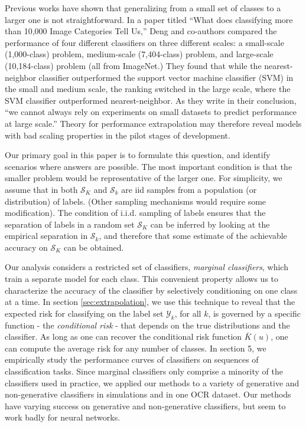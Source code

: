 \documentclass[12pt]{article}
\begin{document}
Previous works have shown that generalizing from a small set of classes 
to a larger one is not straightforward. In a paper titled ``What
does classifying more than 10,000 Image Categories Tell Us,'' Deng and
co-authors compared the performance of four different classifiers on
three different scales: a small-scale (1,000-class) problem,
medium-scale (7,404-class) problem, and large-scale (10,184-class)
problem (all from ImageNet.)  They found that while the
nearest-neighbor classifier outperformed the support vector machine
classifier (SVM) in the small and medium scale, the ranking switched
in the large scale, where the SVM classifier outperformed
nearest-neighbor.  As they write in their conclusion, ``we cannot
always rely on experiments on small datasets to predict performance at
large scale.'' Theory for performance
extrapolation may therefore reveal models with bad scaling properties in the
pilot stages of development.

Our primary goal in this paper is to formulate this question, and
identify scenarios where answers are possible. 
The most important condition is that the smaller problem would be 
representative of the larger one. For simplicity, we
assume that in both $\mathcal{S}_K$ and $\mathcal{S}_k$ are iid samples
from a population (or distribution) of labels. (Other sampling 
mechanisms would require some modification). 
The condition of i.i.d. sampling of labels ensures that the
separation of labels in a random set $\mathcal{S}_K$ can be inferred by
looking at the empirical separation in $\mathcal{S}_k$, and
therefore that some estimate of the achievable accuracy on
$\mathcal{S}_K$ can be obtained.

Our analysis considers a restricted set of classifiers,
\emph{marginal classifiers}, which train a separate model for each class. 
This convenient property allows us to
characterize the accuracy of the classifier by selectively
conditioning on one class at a time.  In section \ref{sec:extrapolation}, we use this
technique to reveal that the expected risk for classifying on the
label set $\mathcal{Y}_k$, for all $k$, is governed by a
specific function - the \emph{conditional risk} -  
that depends on the true distributions and the classifier. 
As long as one can recover the conditional risk
function $\bar{K}(u)$, one can compute the average risk for any number
of classes. 
  In section 5, we
empirically study the performance curves of classifiers on sequences
of classification tasks.  Since marginal classifiers only comprise a
minority of the classifiers used in practice, we applied our methods
to a variety of generative and non-generative classifiers in
simulations and in one OCR dataset.  Our methods have varying success
on generative and non-generative classifiers, but seem to work badly
for neural networks.
\newline
\end{document}

